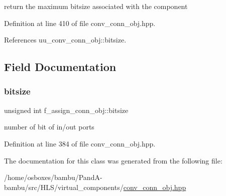 return the maximum bitsize associated with the component 



Definition at line 410 of file conv\+\_\+conn\+\_\+obj.\+hpp.



References uu\+\_\+conv\+\_\+conn\+\_\+obj\+::bitsize.



\subsection{Field Documentation}
\mbox{\label{classf__assign__conn__obj_a04eb19fba311c3a6d11da5af72846a50}} 
\subsubsection{\texorpdfstring{bitsize}{bitsize}}
{\footnotesize\ttfamily unsigned int f\+\_\+assign\+\_\+conn\+\_\+obj\+::bitsize\hspace{0.3cm}{\ttfamily [private]}}



number of bit of in/out ports 



Definition at line 384 of file conv\+\_\+conn\+\_\+obj.\+hpp.



The documentation for this class was generated from the following file\+:\begin{DoxyCompactItemize}
\item 
/home/osboxes/bambu/\+Pand\+A-\/bambu/src/\+H\+L\+S/virtual\+\_\+components/\hyperlink{conv__conn__obj_8hpp}{conv\+\_\+conn\+\_\+obj.\+hpp}\end{DoxyCompactItemize}
